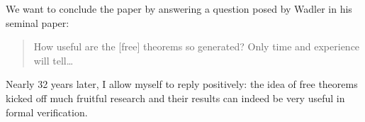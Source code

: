 \documentclass[12pt]{article}
\theoremstyle{plain}
\theoremstyle{definition}
\begin{document}
We want to conclude the paper by answering a question posed by Wadler in his seminal paper:
\begin{quote}
How useful are the [free] theorems so generated? Only time and experience will tell\dots
\end{quote}
Nearly 32 years later, I allow myself to reply positively:
the idea of free theorems kicked off much fruitful research and their results can indeed be very useful in formal verification.

\newpage


\end{document}
